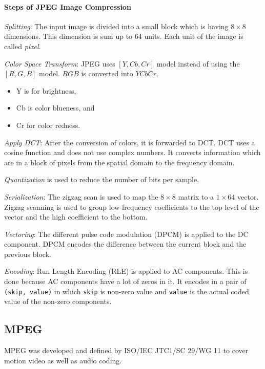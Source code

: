 \paragraph*{Steps of JPEG Image Compression}
\begin{steps}
	\item \textit{Splitting}: The input image is divided into a small block which is having $ 8 \times 8 $ dimensions. This dimension is sum up to 64 units. Each unit of the image is called \textit{pixel}.
	\item \textit{Color Space Transform}: JPEG uses $ [Y,Cb,Cr] $ model instead of using the $ [R,G,B] $ model. $ RGB $ is converted into $ YCbCr $.
	\begin{itemize}
		\item Y is for brightness, 
		\item Cb is color blueness, and 
		\item Cr for color redness. 
	\end{itemize}
	\item \textit{Apply DCT}: After the conversion of colors, it is forwarded to DCT. DCT uses a cosine function and does not use complex numbers. It converts information which are in a block of pixels from the spatial domain to the frequency domain.
	\item \textit{Quantization}  is used to reduce the number of bits per sample.
	\item \textit{Serialization}: The zigzag scan is used to map the $ 8 \times8 $ matrix to a $ 1 \times 64 $ vector. Zigzag scanning is used to group low-frequency coefficients to the top level of the vector and the high coefficient to the bottom. 
	\item \textit{Vectoring}: The different pulse code modulation (DPCM) is applied to the DC component. DPCM encodes the difference between the current block and the previous block.
	\item \textit{Encoding}: Run Length Encoding (RLE) is applied to AC components. This is done because AC components have a lot of zeros in it. It encodes in a pair of \texttt{(skip, value)} in which \texttt{skip} is non-zero value and \texttt{value} is the actual coded value of the non-zero components.	
\end{steps}

\subsection{MPEG}
MPEG was developed and defined by ISO/IEC JTC1/SC 29/WG 11 to cover motion video as well as audio coding. 


